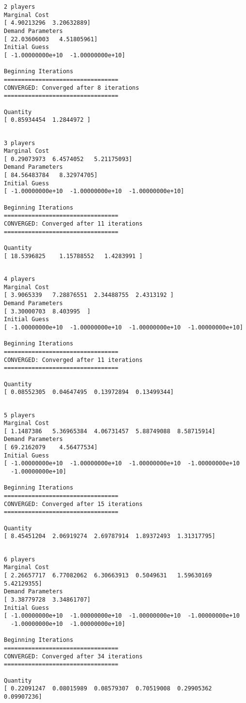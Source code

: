\documentclass[11pt]{article}
\begin{document}
\begin{verbatim}
2 players
Marginal Cost
[ 4.90213296  3.20632889]
Demand Parameters
[ 22.03606003   4.51805961]
Initial Guess
[ -1.00000000e+10  -1.00000000e+10]

Beginning Iterations
=================================
CONVERGED: Converged after 8 iterations
=================================

Quantity
[ 0.85934454  1.2844972 ]
\end{verbatim}
\begin{verbatim}

3 players
Marginal Cost
[ 0.29073973  6.4574052   5.21175093]
Demand Parameters
[ 84.56483784   8.32974705]
Initial Guess
[ -1.00000000e+10  -1.00000000e+10  -1.00000000e+10]

Beginning Iterations
=================================
CONVERGED: Converged after 11 iterations
=================================

Quantity
[ 18.5396825    1.15788552   1.4283991 ]

\end{verbatim}
\begin{verbatim}

4 players
Marginal Cost
[ 3.9065339   7.28876551  2.34488755  2.4313192 ]
Demand Parameters
[ 3.30000703  8.403995  ]
Initial Guess
[ -1.00000000e+10  -1.00000000e+10  -1.00000000e+10  -1.00000000e+10]

Beginning Iterations
=================================
CONVERGED: Converged after 11 iterations
=================================

Quantity
[ 0.08552305  0.04647495  0.13972894  0.13499344]

\end{verbatim}
\begin{verbatim}

5 players
Marginal Cost
[ 1.1487386   5.36965384  4.06731457  5.88749088  8.58715914]
Demand Parameters
[ 69.2162079    4.56477534]
Initial Guess
[ -1.00000000e+10  -1.00000000e+10  -1.00000000e+10  -1.00000000e+10
  -1.00000000e+10]

Beginning Iterations
=================================
CONVERGED: Converged after 15 iterations
=================================

Quantity
[ 8.45451204  2.06919274  2.69787914  1.89372493  1.31317795]

\end{verbatim}
\begin{verbatim}

6 players
Marginal Cost
[ 2.26657717  6.77082062  6.30663913  0.5049631   1.59630169  5.42129355]
Demand Parameters
[ 3.38779728  3.34861707]
Initial Guess
[ -1.00000000e+10  -1.00000000e+10  -1.00000000e+10  -1.00000000e+10
  -1.00000000e+10  -1.00000000e+10]

Beginning Iterations
=================================
CONVERGED: Converged after 34 iterations
=================================

Quantity
[ 0.22091247  0.08015989  0.08579307  0.70519008  0.29905362  0.09907236]
\end{verbatim}
\end{document}
